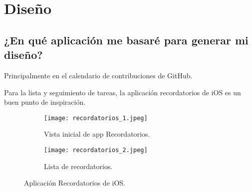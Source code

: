\documentclass[11pt]{scrartcl} %
\begin{document}
\pagebreak

\section{Diseño}

\subsection{¿En qué aplicación me basaré para generar mi diseño?}

Principalmente en el calendario de contribuciones de GitHub.

Para la lista y seguimiento de tareas, la aplicación recordatorios de iOS es un buen punto de inspiración.

\begin{figure}[h]
	\centering
	\begin{subfigure}{.5\textwidth}
		\centering
		\texttt{[image: recordatorios\_1.jpeg]}
		\caption{Vista inicial de app Recordatorios.}
		\label{fig:sub1}
	\end{subfigure}%
	\begin{subfigure}{.5\textwidth}
		\centering
		\texttt{[image: recordatorios\_2.jpeg]}
		\caption{Lista de recordatorios.}
		\label{fig:sub2}
	\end{subfigure}
	\caption{Aplicación Recordatorios de iOS.}
	\label{fig:test}
\end{figure}
\end{document}
